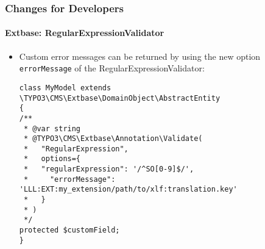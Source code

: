 %

\begin{frame}[fragile]
	\frametitle{Changes for Developers}
	\framesubtitle{Extbase: RegularExpressionValidator}


	\begin{itemize}
		\item Custom error messages can be returned by using the new option
			\texttt{errorMessage} of the RegularExpressionValidator:
\begin{lstlisting}
class MyModel extends \TYPO3\CMS\Extbase\DomainObject\AbstractEntity
{
/**
 * @var string
 * @TYPO3\CMS\Extbase\Annotation\Validate(
 *   "RegularExpression",
 *   options={
 *   "regularExpression": '/^SO[0-9]$/',
 *     "errorMessage": 'LLL:EXT:my_extension/path/to/xlf:translation.key'
 *   }
 * )
 */
protected $customField;
}
\end{lstlisting}

	\end{itemize}

\end{frame}

